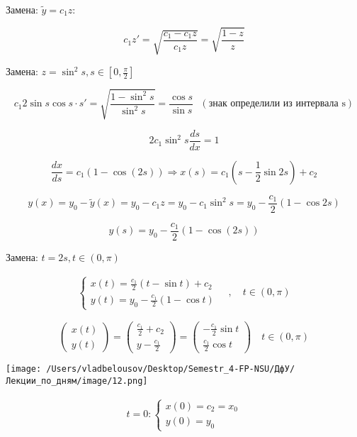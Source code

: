 \documentclass[12pt, a4paper]{report}
\begin{document}
Замена: \( \tilde{y } = c_1 z \): 

\[ c_1 z ' = \sqrt{\frac{c_1 - c_1 z }{c_1 z } }= \sqrt{\frac{1-z}{z } } \] 

Замена: \( z= \sin ^2 s, s \in  \left[ 0 , \frac{\pi}{2}  \right] \) 

\[ c_1 2 \sin s \cos s \cdot s' = \sqrt{ \frac{1- \sin ^2 s }{\sin ^2 s } }= \frac{\cos s }{\sin s } \text{ } (\text{знак определили из интервала s} )   \] 

\[ 2 c_1 \sin ^2 s \frac{ds}{dx } =1     \] 

\[ \frac{dx }{ds }  = c_1 ( 1 - \cos (2s) ) \Rightarrow \boxed{x(s) = c_1 \left( s - \frac{1}{2 }  \sin 2s  \right)+c_2}   \] 

\[ y(x )= y_0 - \tilde{y } (x ) = y_0 - c_1z= y_0 - c_1 \sin ^2 s = y_0 - \frac{c_1}{2} ( 1 - \cos  2s) \]  

\[ \boxed{y(s )= y_0 - \frac{c_1}{2 }  ( 1 - \cos (2s))}   \] 

Замена: \( t = 2s , \text{}  t \in  ( 0 , \pi) \) 

\[ \begin{aligned}
    \begin{cases}
        \displaystyle x(t) = \frac{c_1}{ 2 }  ( t - \sin t ) + c_2  \\ 
        \displaystyle y(t)= y_0 - \frac{c_1}{2 }  ( 1 - \cos t)
    \end{cases}
    \quad , \quad t \in ( 0 , \pi)
\end{aligned} \]

\[ \begin{pmatrix}
x(t )\\
y (t)
\end{pmatrix} = \begin{pmatrix}
\frac{c_1}{2 }  + c_2 \\
y - \frac{c_1}{2} 
\end{pmatrix}= \begin{pmatrix}
-\frac{c_1}{2 } \sin t\\
\frac{c_1}{2}  \cos t 
\end{pmatrix} \quad t \in  (0 , \pi)\] 

\begin{center}
    \texttt{[image: /Users/vladbelousov/Desktop/Semestr\_4-FP-NSU/ДфУ/Лекции\_по\_дням/image/12.png]}
\end{center}

\[ \begin{aligned}
    t= 0 : 
    \begin{cases}
        x(0 ) = c_2 = x_0 \\
        y(0 ) = y_0
    \end{cases}
\end{aligned} \] 
\end{document}
